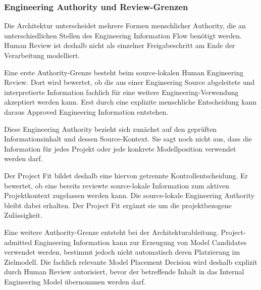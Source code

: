 %
%
%

\subsubsection{Engineering Authority und Review-Grenzen}
\label{sec:authority_review_boundaries}

Die Architektur unterscheidet mehrere Formen menschlicher Authority, die an
unterschiedlichen Stellen des Engineering Information Flow benötigt werden.
Human Review ist deshalb nicht als einzelner Freigabeschritt am Ende der
Verarbeitung modelliert.

Eine erste Authority-Grenze besteht beim source-lokalen Human Engineering
Review. Dort wird bewertet, ob die aus einer Engineering Source abgeleitete und
interpretierte Information fachlich für eine weitere Engineering-Verwendung
akzeptiert werden kann. Erst durch eine explizite menschliche Entscheidung
kann daraus Approved Engineering Information entstehen.

Diese Engineering Authority bezieht sich zunächst auf den geprüften
Informationsinhalt und dessen Source-Kontext. Sie sagt noch nicht aus, dass die
Information für jedes Projekt oder jede konkrete Modellposition verwendet
werden darf.

Der Project Fit bildet deshalb eine hiervon getrennte Kontrollentscheidung.
Er bewertet, ob eine bereits reviewte source-lokale Information zum aktiven
Projektkontext zugelassen werden kann. Die source-lokale Engineering Authority
bleibt dabei erhalten. Der Project Fit ergänzt sie um die projektbezogene
Zulässigkeit.

Eine weitere Authority-Grenze entsteht bei der Architekturableitung.
Project-admitted Engineering Information kann zur Erzeugung von Model
Candidates verwendet werden, bestimmt jedoch nicht automatisch deren
Platzierung im Zielmodell. Die fachlich relevante Model Placement Decision
wird deshalb explizit durch Human Review autorisiert, bevor der betreffende
Inhalt in das Internal Engineering Model übernommen werden darf.

